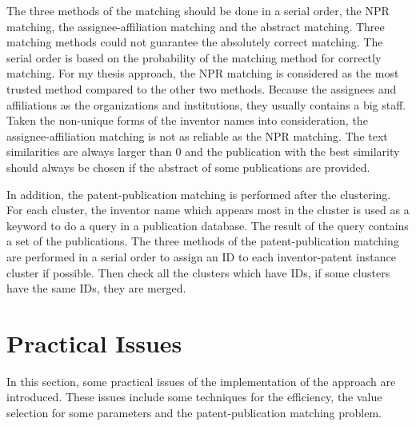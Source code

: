 The three methods of the matching should be done in a serial order, the NPR matching, the assignee-affiliation matching and the abstract matching. Three matching methods could not guarantee the absolutely correct matching. The serial order is based on the probability of the matching method for correctly matching. For my thesis approach, the NPR matching is considered as the most trusted method compared to the other two methods. Because the assignees and affiliations as the organizations and institutions, they usually contains a big staff. Taken the non-unique forms of the inventor names into consideration,  the assignee-affiliation matching is not as reliable as the NPR matching. The text similarities are always larger than 0 and the publication with the best similarity should always be chosen if the abstract of some publications are provided.\newline

In addition, the patent-publication matching is performed after the clustering. For each cluster, the inventor name which appears most in the cluster is used as a keyword to do a query in a publication database. The result of the query contains a set of the publications. The three methods of the patent-publication matching are performed in a serial order to assign an ID to each inventor-patent instance cluster if possible. Then check all the clusters which have IDs, if some clusters have the same IDs, they are merged.

\section{Practical Issues}
In this section, some practical issues of the implementation of the approach are introduced. These issues include some techniques for the efficiency, the value selection for some parameters and the patent-publication matching problem.

